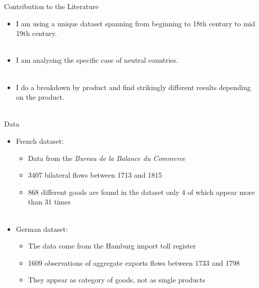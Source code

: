 \documentclass[11pt]{beamer}
\begin{document}
\begin{frame}{Contribution to the Literature}
\begin{itemize}
\item{I am using a unique dataset spanning from beginning to 18th century to mid 19th century.}\\~\\
\item{I am analysing the specific case of neutral countries.}\\~\\
\item{I do a breakdown by product and find strikingly different results depending on the product.}\\~\\
\end{itemize}
\end{frame}


\begin{frame}{Data}
\begin{itemize}
\item{French dataset:}
\begin{itemize}
\item{Data from the \textit{Bureau de la Balance du Commerce}}
\item{3407 bilateral flows between 1713 and 1815}
\item{868 different goods are found in the dataset only 4 of which appear more than 31 times}\\~\\
\end{itemize}
\item{German dataset:}
\begin{itemize}
\item{The data come from the Hamburg import toll register}
\item{1609 observations of aggregate exports flows between 1733 and 1798}
\item{They appear as category of goods, not as single products}
\end{itemize}
\end{itemize}
\end{frame}
\end{document}
